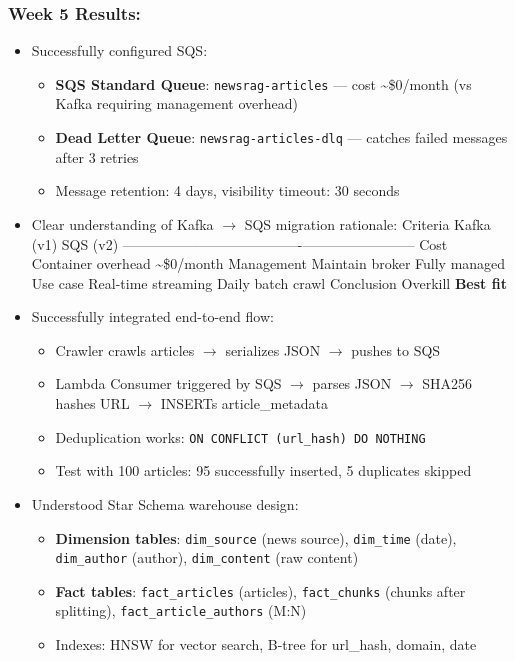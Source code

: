 \hypertarget{week-5-results}{%
\subsubsection{Week 5 Results:}}

\begin{itemize}
\item
  Successfully configured SQS:

  \begin{itemize}
  \tightlist
  \item
    \textbf{SQS Standard Queue}: \texttt{newsrag-articles} --- cost
    \textasciitilde\$0/month (vs Kafka requiring management overhead)
  \item
    \textbf{Dead Letter Queue}: \texttt{newsrag-articles-dlq} ---
    catches failed messages after 3 retries
  \item
    Message retention: 4 days, visibility timeout: 30 seconds
  \end{itemize}
\item
  Clear understanding of Kafka \(\rightarrow\) SQS migration rationale:
  \textbar{} Criteria \textbar{} Kafka (v1) \textbar{} SQS (v2)
  \textbar{}
  \textbar-----------------\textbar----------------------\textbar------------------------\textbar{}
  \textbar{} Cost \textbar{} Container overhead \textbar{}
  \textasciitilde\$0/month \textbar{} \textbar{} Management \textbar{}
  Maintain broker \textbar{} Fully managed \textbar{} \textbar{} Use
  case \textbar{} Real-time streaming \textbar{} Daily batch crawl
  \textbar{} \textbar{} Conclusion \textbar{} Overkill \textbar{}
  \textbf{Best fit} \textbar{}
\item
  Successfully integrated end-to-end flow:

  \begin{itemize}
  \tightlist
  \item
    Crawler crawls articles \(\rightarrow\) serializes JSON
    \(\rightarrow\) pushes to SQS
  \item
    Lambda Consumer triggered by SQS \(\rightarrow\) parses JSON
    \(\rightarrow\) SHA256 hashes URL \(\rightarrow\) INSERTs
    article\_metadata
  \item
    Deduplication works: \texttt{ON\ CONFLICT\ (url\_hash)\ DO\ NOTHING}
  \item
    Test with 100 articles: 95 successfully inserted, 5 duplicates
    skipped
  \end{itemize}
\item
  Understood Star Schema warehouse design:

  \begin{itemize}
  \tightlist
  \item
    \textbf{Dimension tables}: \texttt{dim\_source} (news source),
    \texttt{dim\_time} (date), \texttt{dim\_author} (author),
    \texttt{dim\_content} (raw content)
  \item
    \textbf{Fact tables}: \texttt{fact\_articles} (articles),
    \texttt{fact\_chunks} (chunks after splitting),
    \texttt{fact\_article\_authors} (M:N)
  \item
    Indexes: HNSW for vector search, B-tree for url\_hash, domain, date
  \end{itemize}
\end{itemize}
